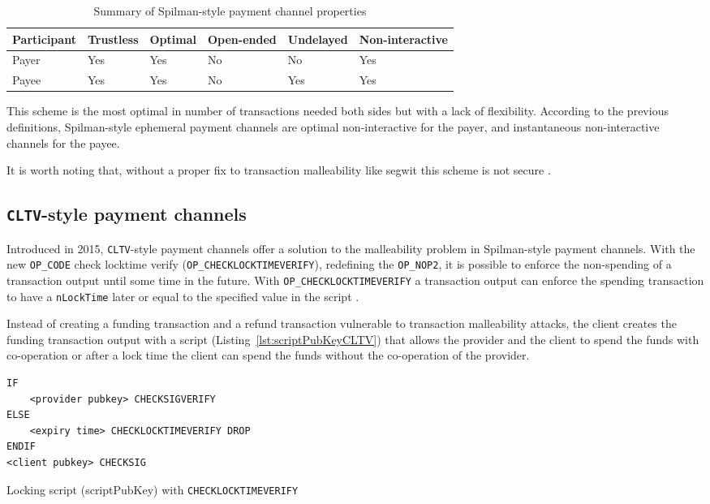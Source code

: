 \documentclass{llncs}
\begin{document}
\begin{table}[ht]
  \begin{tabularx}{\textwidth}{ | X | l | l | l | l | l |}
  \hline
  Participant & Trustless & Optimal & Open-ended & Undelayed & Non-interactive \\
  \hline \hline
  Payer & Yes & Yes & No & No & Yes \\ \hline
  Payee & Yes & Yes & No & Yes & Yes \\
  \hline
  \end{tabularx}
  \caption{Summary of Spilman-style payment channel properties}
  \label{fig:summarySpilmanPaymentChannel}
\end{table}

This scheme is the most optimal in number of transactions needed both sides but with a lack of flexibility. According to the previous definitions, Spilman-style ephemeral payment channels are optimal non-interactive for the payer, and instantaneous non-interactive channels for the payee.

It is worth noting that, without a proper fix to transaction malleability like \gls{segwit} this scheme is not secure \cite{SegWitBIP, BIP62, DBLP:journals/corr/AndrychowiczDMM13, DBLP:journals/corr/DeckerW14}.

\subsection{\texttt{CLTV}-style payment channels}

Introduced in 2015, \texttt{CLTV}-style payment channels offer a solution to the malleability problem in Spilman-style payment channels. With the new \texttt{OP\_CODE} check locktime verify (\texttt{OP\_CHECKLOCKTIMEVERIFY}), redefining the \texttt{OP\_NOP2}, it is possible to enforce the non-spending of a transaction output until some time in the future. With \texttt{OP\_CHECKLOCKTIMEVERIFY} a transaction output can enforce the spending transaction to have a \texttt{nLockTime} later or equal to the specified value in the script \cite{BIP65}.

Instead of creating a funding transaction and a refund transaction vulnerable to transaction malleability attacks, the client creates the funding transaction output with a script (Listing~\ref{lst:scriptPubKeyCLTV}) that allows the provider and the client to spend the funds with co-operation or after a lock time the client can spend the funds without the co-operation of the provider.

\begin{listing}[ht]
  \begin{verbatim}
IF
    <provider pubkey> CHECKSIGVERIFY
ELSE
    <expiry time> CHECKLOCKTIMEVERIFY DROP
ENDIF
<client pubkey> CHECKSIG
  \end{verbatim}
  \caption{Locking script (scriptPubKey) with \texttt{CHECKLOCKTIMEVERIFY}}
  \label{lst:scriptPubKeyCLTV}
\end{listing}
\end{document}
